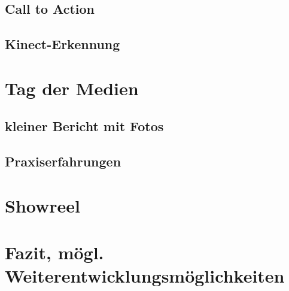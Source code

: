 \subsection{Call to Action}
\subsection{Kinect-Erkennung}


\section{Tag der Medien}
\subsection{kleiner Bericht mit Fotos}
\subsection{Praxiserfahrungen}

\section{Showreel}
\section{Fazit, mögl. Weiterentwicklungsmöglichkeiten}

